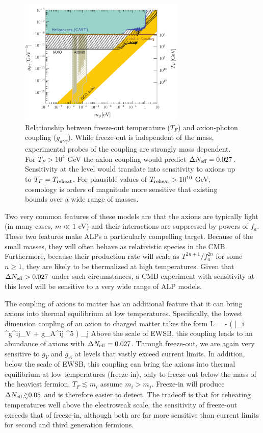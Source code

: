 \begin{figure}[h!]
\centering \includegraphics[width=0.70\textwidth]{Neutrinos/AxionPhotonWithFuture.pdf}
\caption{Relationship between freeze-out temperature ($T_F$) and axion-photon coupling ($g_{a\gamma\gamma}$).  While freeze-out is independent of the mass, experimental probes of the coupling are strongly mass dependent.  For $T_F > 10^4$ GeV the axion coupling would predict $\Delta N_{\rm eff} = 0.027$.  Sensitivity at the level would translate into sensitivity to axions up to $T_F = T_{\rm reheat}$.  For plausible values of $T_{\rm reheat} > 10^{10}$ GeV, cosmology is orders of magnitude more sensitive that existing bounds over a wide range of masses.}
\label{fig:axionphoton}
\end{figure}

Two very common features of these models are that the axions are typically light (in many cases, $m \ll 1$ eV) and their interactions are suppressed by powers of $f_a$.  These two features make ALPs a particularly compelling target.  Because of the small masses, they will often behave as relativistic species in the CMB.  Furthermore, because their production rate will scale as $T^{2n +1} / f_a^{2n}$ for some $n \geq 1$, they are likely to be thermalized at high temperatures.  Given that $\Delta N_{\rm eff} > 0.027$ under such circumstances, a CMB experiment with sensitivity at this level will be sensitive to a very wide range of ALP models.

The coupling of axions to matter has an additional feature that it can bring axions into thermal equilibrium at low temperatures.  Specifically, the lowest dimension coupling of an axion to charged matter takes the form
\beq
{\cal L} = - ( \bar \psi_i \gamma^\mu g^{ij}_V + g_A^{ij} \gamma^5 ) \psi_j
\eeq
Above the scale of EWSB, this coupling leads to an abundance of axions with $\Delta N_{\rm eff} = 0.027$.  Through freeze-out, we are again very sensitive to $g_V$ and $g_A$ at levels that vastly exceed current limits.  In addition, below the scale of EWSB, this coupling can bring the axions into thermal equilibrium at low temperatures (freeze-in), only to freeze-out below the mass of the heaviest fermion, $T_F \lesssim m_{i}$ assume $m_i > m_j$.  Freeze-in will produce $\Delta \Neff \gtrsim 0.05$ and is therefore easier to detect.  The tradeoff is that for reheating temperatures well above the electroweak scale, the sensitivity of freeze-out exceeds that of freeze-in, although both are far more sensitive than current limits for second and third generation fermions.

